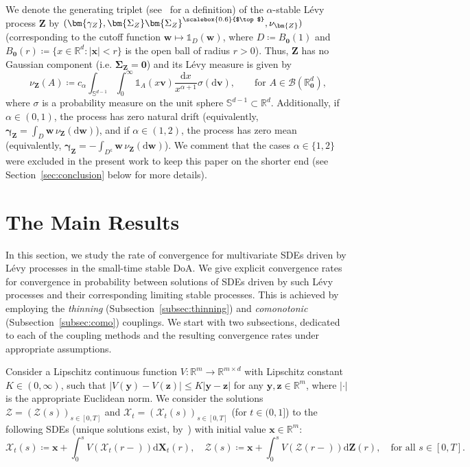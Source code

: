 \documentclass[en,oneside,bbfont,article]{amsart}
\theoremstyle{remark}
\theoremstyle{definition}
\theoremstyle{definition}
\newcommand\X{\bm{\mathcal{X}}}
\newcommand\ZZ{\bm{\mathcal{Z}}}
\newcommand\Sp{\mathbb{S}}
\newcommand\R{\mathbb{R}}
\newcommand\1{\mathds{1}}
\renewcommand\le{\leqslant}
\newcommand\co{\mathsf{c}}
\newcommand{\D}{\mathrm{d}}
\newcommand{\tra}{{\scalebox{0.6}{$\top$}}}
\newcommand\david[1]{{\color{blue}#1}}
\begin{document}
We denote the generating triplet (see~\cite[Def.~8.2]{MR3185174} for a definition) of the $\alpha$-stable L\'evy process $\bm{Z}$ by $(\bm{\gamma_Z},\bm{\Sigma_Z}\bm{\Sigma_Z}^\tra,\nu_{\bm{Z}})$ (corresponding to the cutoff function $\bm{w}\mapsto\1_{D}(\bm{w})$, where $D\coloneqq B_{\bm{0}}(1)$ and $B_{\bm{0}}(r)\coloneqq \{x \in \R^d: |\bm{x}|<r\}$ is the open ball of radius $r>0$). Thus, $\bm{Z}$ has no Gaussian component (i.e. $\bm{\Sigma}_{\bm{Z}}=\bm{0}$) and its L\'evy measure is given by
\begin{equation}\label{eq:mu_measure_defn}
\nu_{\bm{Z}}(A)
\coloneqq c_\alpha\int_{\Sp^{d-1}}\int_0^\infty\1_{A}(x\bm{v})\frac{\D x}{x^{\alpha+1}}\sigma(\D\bm{v}), 
\qquad \text{for }A\in\mathcal{B}(\R^d_{\bm{0}}),
\end{equation}
where $\sigma$ is a probability measure on the unit sphere $\Sp^{d-1}\subset\R^d$. Additionally, if $\alpha\in(0,1)$, the process has zero natural drift (equivalently, %
$\bm{\gamma}_{\bm{Z}}=\int_D\bm{w}\,\nu_{\bm{Z}}(\D\bm{w})$), and if $\alpha\in(1,2)$, the process has zero mean (equivalently, %
$\bm{\gamma}_{\bm{Z}}=-\int_{D^\co}\bm{w}\,\nu_{\bm{Z}}(\D\bm{w})$). We comment that the cases $\alpha\in\{1,2\}$ were excluded in the present work to keep this paper on the shorter end (see Section~\ref{sec:conclusion} below for more details).


\section{The Main Results}
\label{sec:main}

In this section, we study the rate of convergence for multivariate SDEs driven by L\'evy processes in the small-time stable DoA. We give explicit convergence rates for convergence in probability between solutions of SDEs driven by such L\'evy processes and their corresponding limiting stable processes. This is achieved by employing the \emph{thinning} (Subsection~\ref{subsec:thinning}) and \emph{comonotonic} (Subsection~\ref{subsec:como}) couplings. We start with two subsections, dedicated to each of the coupling methods and the resulting convergence rates under appropriate assumptions. 

Consider a Lipschitz continuous function $V:\R^m \to \R^{m\times d}$ with Lipschitz constant $K \in (0,\infty)$, such that $|V(\bm{y})-V(\bm{z})|\le K|\bm{y}-\bm{z}|$ for any $\bm{y},\bm{z}\in\R^{m}$, where $|\cdot|$ is the appropriate Euclidean norm. We consider the solutions $\ZZ=(\ZZ(s))_{s\in[0,T]}$ and $\X_t=(\X_t(s))_{s\in[0,T]}$ (for $t\in(0,1]$) to the following SDEs (unique solutions exist, by~\cite[Thm~6.2.3]{Applebaum_2009}) with initial value $\bm{x}\in\R^m$: 
\begin{equation}
\label{eq:main_SDE_setting}
\X_t(s)\coloneqq \bm{x}+\int_0^s V(\X_t(r-))\D \bm{X}_t(r), 
\quad %
\ZZ(s)\coloneqq \bm{x}+\int_0^s V(\ZZ(r-))\D \bm{Z}(r),%
\quad\text{for all }s \in [0,T].
\end{equation} 
\end{document}
